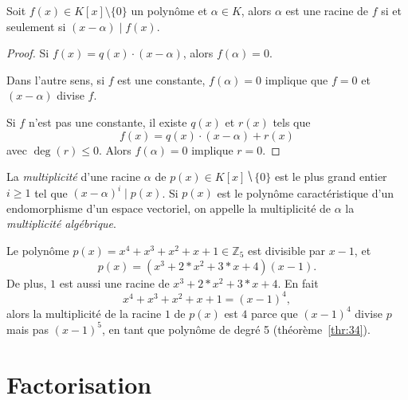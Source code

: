 \begin{theorem}
  \label{thr:35}
  Soit $f(x)∈ K[x] \setminus \{0\}$ un polynôme  et $\alpha \in K$, alors $\alpha$ est une racine de $f$ si et seulement si $(x- \alpha)  \mid f(x)$. 
\end{theorem}

\begin{proof}
  Si $f(x) = q(x) \cdot (x - \alpha)$, alors $f(\alpha) = 0$. 

Dans l'autre sens, si $f$ est une constante, $f(\alpha) = 0$ implique que $f = 0$ et $(x - \alpha)$ divise $f$. 

Si $f$ n'est pas une constante, il existe $q(x)$ et $r(x)$ tels que
\begin{displaymath}
  f(x) = q(x) \cdot (x - \alpha) + r(x)
\end{displaymath}
avec $\deg(r) \leq 0$. Alors $f(\alpha) = 0$ implique $r=0$. 
\end{proof}


\begin{definition}
  \label{def:41}
  La \emph{multiplicité} d'une racine $α$ de $p(x) ∈ K[x] ⧹\{0\}$ est le plus grand entier $i≥1$ tel que $ (x-α)^i \mid p(x)$. Si $p(x)$ est le polynôme caractéristique d'un endomorphisme d'un espace vectoriel, on appelle la multiplicité de $α$ la \emph{multiplicité algébrique}. 
\end{definition} 


\begin{example}  
  \label{exe:45}
  Le polynôme  $p(x) = x^4 + x^3 + x^2 + x + 1  ∈ℤ_5$  est divisible par $x-1$, et
  \begin{displaymath}
    p(x)  = (x^3 + 2*x^2 + 3*x + 4)  (x-1). 
  \end{displaymath}
  De plus, $1$ est aussi une racine de $x^3 + 2*x^2 + 3*x + 4$. En fait 
  \begin{displaymath}
    x^4 + x^3 + x^2 + x + 1 = (x-1)^4,
  \end{displaymath}
  alors la multiplicité de la racine $1$ de $p(x)$ est $4$ parce que $(x-1)^4$ divise $p$ mais pas $(x-1)^5$, en tant que polynôme de degré 5 (théorème~\ref{thr:34}).   
\end{example}


\section{Factorisation}
\label{sec:fact-de-polyn}

